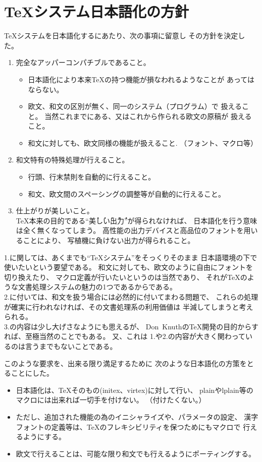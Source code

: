 \section{\TeX システム日本語化の方針}
\TeX システムを日本語化するにあたり、次の事項に留意し
その方針を決定した。
\begin{enumerate}
\item 完全なアッパーコンパチブルであること。
	\begin{itemize}
	\item 日本語化により本来\TeX の持つ機能が損なわれるようなことが
		あってはならない。
	\item 欧文、和文の区別が無く、同一のシステム（プログラム）で
		扱えること。
		当然これまでにある、又はこれから作られる欧文の原稿が
		扱えること。
	\item 和文に対しても、欧文同様の機能が扱えること.
		（フォント、マクロ等）
	\end{itemize}
\item 和文特有の特殊処理が行えること。
	\begin{itemize}
	\item 行頭、行末禁則を自動的に行えること。
	\item 和文、欧文間のスペーシングの調整等が自動的に行えること。
	\end{itemize}
\item 仕上がりが美しいこと。\\
	\TeX 本来の目的である``\.美\.し\.い\.出\.力''が得られなければ、
	日本語化を行う意味は全く無くなってしまう。
	高性能の出力デバイスと高品位のフォントを用いることにより、
	写植機に負けない出力が得られること。
\end{enumerate}
1.に関しては、あくまでも``\TeX システム''をそっくりそのまま
日本語環境の下で使いたいという要望である。
和文に対しても、欧文のように自由にフォントを切り換えたり、
マクロ定義が行いたいというのは当然であり、
それが\TeX のような文書処理システムの魅力の1つであるからである。\\
2.に付いては、和文を扱う場合には必然的に付いてまわる問題で、
これらの処理が確実に行われなければ、その文書処理系の利用価値は
半減してしまうと考えられる。\\
3.の内容は少し大げさなようにも思えるが、
Don\nolinebreak\ Knuthの\TeX 開発の目的からすれば、至極当然のことでもある。
又、これは 1.や2.の内容が大きく関わっているのは言うまでもないことである。

このような要求を、出来る限り満足するために
次のような日本語化の方策をとることにした。
\begin{itemize}
\item 日本語化は、\TeX そのもの(initex、virtex)に対して行い、
	plainやlplain等のマクロには出来れば一切手を付けない。
	（付けたくない。）
\item ただし、追加された機能の為のイニシャライズや、パラメータの設定、
	漢字フォントの定義等は、\TeX のフレキシビリティを保つためにもマクロで
	行えるようにする。
\item 欧文で行えることは、可能な限り和文でも行えるようにポーティングする。
\end{itemize}
%
\newpage
